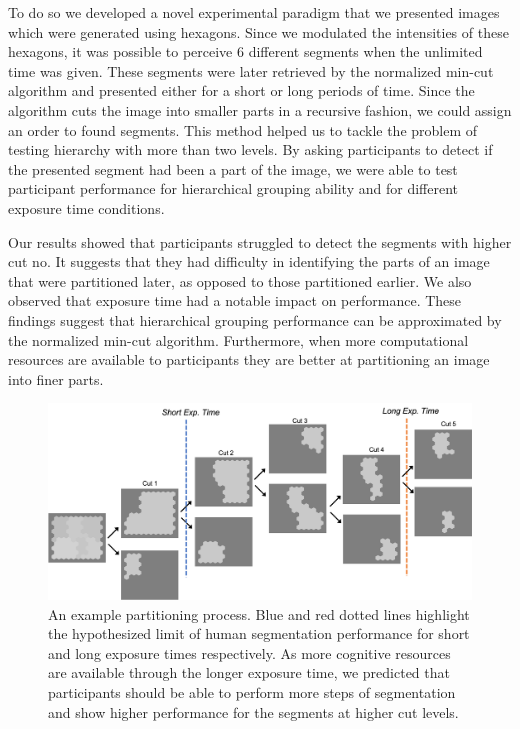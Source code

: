 \documentclass{article}
\begin{document}
To do so we developed a novel experimental paradigm that we presented images which were generated using hexagons. Since we modulated the intensities of these hexagons, it was possible to perceive 6 different segments when the unlimited time was given. These segments were later retrieved by the normalized min-cut algorithm and presented either for a short or long periods of time. Since the algorithm cuts the image into smaller parts in a recursive fashion, we could assign an order to found segments. This method helped us to tackle the problem of testing hierarchy with more than two levels. By asking participants to detect if the presented segment had been a part of the image, we were able to test participant performance for hierarchical grouping ability and for different exposure time conditions. 

Our results showed that participants struggled to detect the segments with higher cut no. It suggests that they had difficulty in identifying the parts of an image that were partitioned later, as opposed to those partitioned earlier. We also observed that exposure time had a notable impact on performance. These findings suggest that hierarchical grouping performance can be approximated by the normalized min-cut algorithm. Furthermore, when more computational resources are available to participants they are better at partitioning an image into finer parts. 

\begin{figure}
    \centering
    \hspace*{-0.85cm} 
    \includegraphics[width=1.2\textwidth]{figs/segmentation_example.png}
    \caption{An example partitioning process. Blue and red dotted lines highlight the hypothesized limit of human segmentation performance for short and long exposure times respectively. As more cognitive resources are available through the longer exposure time, we predicted that participants should be able to perform more steps of segmentation and show higher performance for the segments at higher cut levels.}
    \label{fig:hypothesis}
\end{figure}
\end{document}
